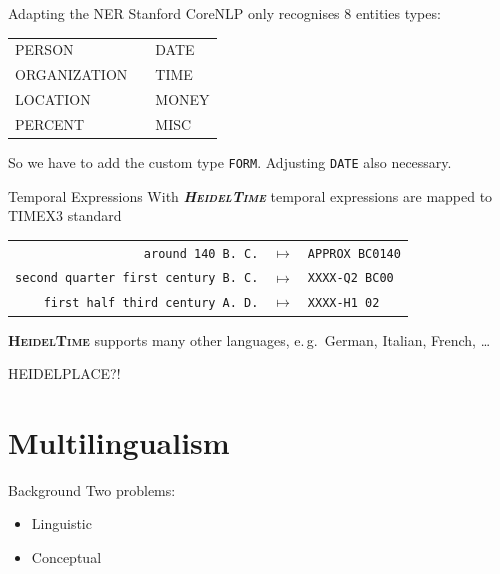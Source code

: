 \documentclass[xcolor=x11names, aspectratio=169,usenames,dvipsnames]{beamer}
\begin{document}
\begin{frame}[fragile]{Adapting the NER}
Stanford CoreNLP only recognises 8 entities types:

\begin{center}\ttfamily
\begin{tabular}{lp{3em}l}
PERSON&&DATE\\
ORGANIZATION&&TIME\\
LOCATION&&MONEY\\
PERCENT&&MISC
\end{tabular}
\end{center}

So we have to add the custom type \texttt{FORM}. Adjusting \texttt{DATE} also necessary.
\end{frame}

\begin{frame}{Temporal Expressions}
With \textbf{\textit{\textsc{HeidelTime}}} temporal expressions are mapped to TIMEX3 standard
\begin{center}
{\renewcommand{\arraystretch}{1.2}%
\begin{tabular}{rcl}
\texttt{around 140 B.\,C.}&$\longmapsto$&\texttt{APPROX BC0140}\\
\texttt{second quarter first century B.\,C.}&$\longmapsto$&\texttt{XXXX-Q2 BC00}\\
\texttt{first half third century A.\,D.}&$\longmapsto$&\texttt{XXXX-H1 02}\\
\end{tabular}
}
\end{center}
\pause
\textbf{\textsc{HeidelTime}} supports many other languages, e.\,g.\ German, Italian, French, \dots

HEIDELPLACE?!
\end{frame}


\section{Multilingualism}

\begin{frame}{Background}
Two problems:
\begin{itemize}
\item Linguistic
\item Conceptual
\end{itemize}
\end{frame}
\end{document}
